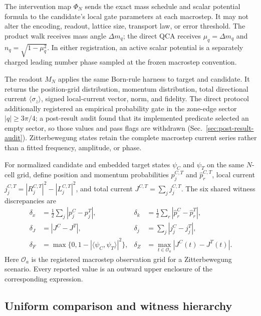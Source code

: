 The intervention map $\Phi_N$ sends the exact mass schedule and scalar
potential formula to the candidate's local gate parameters at each macrostep.
It may not alter the encoding, readout, lattice size, transport law, or error
threshold.  The product walk receives mass angle $\Delta m_q$; the direct QCA
receives $\mu_q=\Delta m_q$ and $n_q=\sqrt{1-\mu_q^2}$.  In either
registration, an active scalar potential is a separately charged leading
number phase sampled at the frozen macrostep convention.

The readout $M_N$ applies the same Born-rule harness to target and candidate.
It returns the position-grid distribution, momentum distribution, total
directional current $\langle\sigma_z\rangle$, signed local-current vector,
norm, and fidelity.  The direct protocol additionally registered an empirical
probability gate in the zone-edge sector $|q|\ge3\pi/4$; a post-result audit
found that its implemented predicate selected an empty sector, so those values
and pass flags are withdrawn (Sec.~\ref{sec:post-result-audit}).  Zitterbewegung states retain
the complete macrostep current series rather than a fitted frequency,
amplitude, or phase.

For normalized candidate and embedded target states $\psi_C$ and $\psi_T$ on
the same $N$-cell grid, define position and momentum probabilities
$p_j^{C,T}$ and $\widehat p_r^{C,T}$, local current
$j_j^{C,T}=|R_j^{C,T}|^2-|L_j^{C,T}|^2$, and total current
$J^{C,T}=\sum_j j_j^{C,T}$.  The six shared witness discrepancies are
\begin{equation}
 \begin{aligned}
 \delta_x&=\tfrac12\sum_j|p_j^C-p_j^T|,&
 \delta_k&=\tfrac12\sum_r|\widehat p_r^C-\widehat p_r^T|,\\
 \delta_J&=|J^C-J^T|,&
 \delta_j&=\sum_j|j_j^C-j_j^T|,\\
 \delta_F&=\max\{0,1-|\langle\psi_C,\psi_T\rangle|^2\},&
 \delta_Z&=\max_{t\in\mathcal O_a}|J^C(t)-J^T(t)|.
 \end{aligned}
 \label{eq:witness-metrics}
\end{equation}
Here $\mathcal O_a$ is the registered macrostep observation grid for a
Zitterbewegung scenario.  Every reported value is an outward upper enclosure
of the corresponding expression.

\subsection{Uniform comparison and witness hierarchy}

